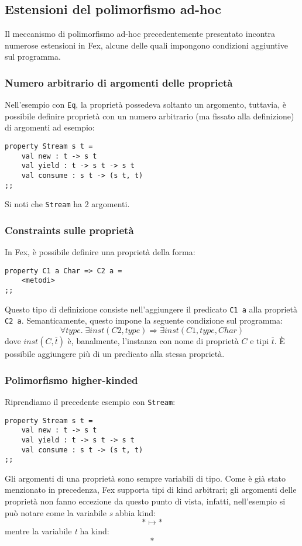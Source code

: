 \documentclass[10pt,a4paper]{article}
\begin{document}
\hypertarget{Estensioni del polimorfismo ad-hoc}{\subsection{Estensioni del polimorfismo ad-hoc}}
Il meccanismo di polimorfismo ad-hoc precedentemente presentato incontra numerose estensioni in Fex, alcune delle
quali impongono condizioni aggiuntive sul programma.

\hypertarget{Numero arbitrario di argomenti delle proprietà}{\subsubsection{Numero arbitrario di argomenti delle proprietà}}
Nell'esempio con \texttt{Eq}, la proprietà possedeva soltanto un argomento, tuttavia, è possibile definire proprietà
con un numero arbitrario (ma fissato alla definizione) di argomenti ad esempio:
\begin{lstlisting}
property Stream s t =
    val new : t -> s t
    val yield : t -> s t -> s t
    val consume : s t -> (s t, t)
;;
\end{lstlisting}
Si noti che \texttt{Stream} ha 2 argomenti.

\hypertarget{Constraints sulle proprietà}{\subsubsection{Constraints sulle proprietà}}
In Fex, è possibile definire una proprietà della forma:
\begin{lstlisting}
property C1 a Char => C2 a =
    <metodi>
;;
\end{lstlisting}
Questo tipo di definizione consiste nell'aggiungere il predicato \texttt{C1 a} alla proprietà \texttt{C2 a}.
Semanticamente, questo impone la seguente condizione sul programma:
    \[ \forall type . \; \exists inst(C2, type) \Longrightarrow \exists inst(C1, type, Char) \]
dove $ inst(C, \overline{t}) $ è, banalmente, l'instanza con nome di proprietà $ C $ e tipi $ \overline{t} $. \`E
possibile aggiungere più di un predicato alla stessa proprietà.

\hypertarget{Polimorfismo higher-kinded}{\subsubsection{Polimorfismo higher-kinded}}
Riprendiamo il precedente esempio con \texttt{Stream}:
\begin{lstlisting}
property Stream s t =
    val new : t -> s t
    val yield : t -> s t -> s t
    val consume : s t -> (s t, t)
;;
\end{lstlisting}
Gli argomenti di una proprietà sono sempre variabili di tipo. Come è già stato menzionato in precedenza, Fex supporta
tipi di kind arbitrari; gli argomenti delle proprietà non fanno eccezione da questo punto di vista, infatti, nell'esempio
si può notare come la variabile \textit{s} abbia kind:
\[ * \mapsto * \]
mentre la variabile \textit{t} ha kind:
\[ * \]
\end{document}
